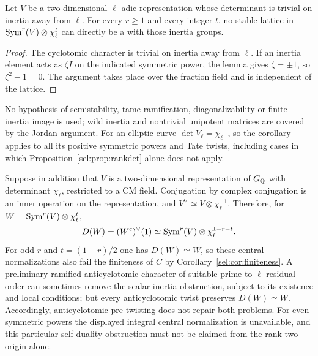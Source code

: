 \begin{corollary}\label{sel:cor:sympowers}
Let $V$ be a two-dimensional $\ell$-adic representation whose determinant is
trivial on inertia away from $\ell$. For every $r\ge1$ and every integer
$t$, no stable lattice in $\operatorname{Sym}^r(V)\otimes\chi_\ell^t$ can directly be a
 with those inertia groups.
\end{corollary}

\begin{proof}
The cyclotomic character is trivial on inertia away from $\ell$. If an
inertia element acts as $\zeta I$ on the indicated symmetric power, the
lemma gives $\zeta=\pm1$, so $\zeta^2-1=0$. The argument takes place over
the fraction field and is independent of the lattice.
\end{proof}

No hypothesis of semistability, tame ramification, diagonalizability or
finite inertia image is used; wild inertia and nontrivial unipotent matrices
are covered by the Jordan argument. For an elliptic curve
$\det V_\ell=\chi_\ell$~\cite{Milne2008Abelian}, so the corollary applies to
all its positive symmetric powers and Tate twists, including cases in which
Proposition~\ref{sel:prop:rankdet} alone does not apply.

\begin{remark}\label{sel:rem:central}
Suppose in addition that $V$ is a two-dimensional representation of
$G_{\mathbb{Q}}$ with determinant $\chi_\ell$, restricted to a CM field. Conjugation
by complex conjugation is an inner operation on the representation, and
$V^\vee\simeq V\otimes\chi_\ell^{-1}$. Therefore, for
$W=\operatorname{Sym}^r(V)\otimes\chi_\ell^t$,
\[
 D(W)=(W^c)^\vee(1)\simeq\operatorname{Sym}^r(V)\otimes\chi_\ell^{1-r-t}.
\]
For odd $r$ and $t=(1-r)/2$ one has $D(W)\simeq W$, so these central
normalizations also fail the finiteness of $C$ by
Corollary~\ref{sel:cor:finiteness}. A preliminary ramified anticyclotomic character
of suitable prime-to-$\ell$ residual order can sometimes remove the
scalar-inertia obstruction, subject to its existence and local conditions;
but every anticyclotomic twist preserves $D(W)\simeq W$. Accordingly,
anticyclotomic pre-twisting does not repair both problems. For even
symmetric powers the displayed integral central normalization is
unavailable, and this particular self-duality obstruction must not be
claimed from the rank-two origin alone.
\end{remark}

